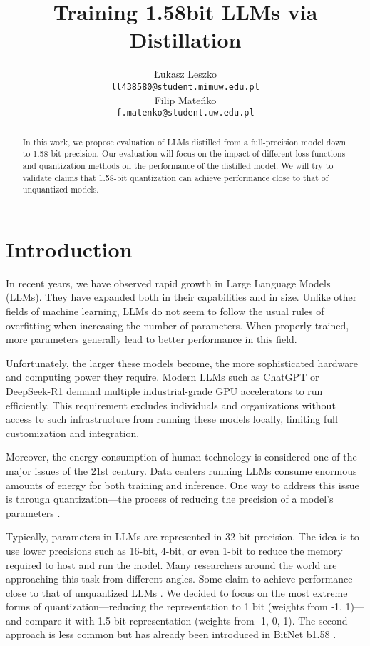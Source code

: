 \documentclass{article}
\title{Training 1.58bit LLMs via Distillation}
\author{Łukasz Leszko \\
	\texttt{ll438580@student.mimuw.edu.pl} \\
	\And
	Filip Mateńko \\
	\texttt{f.matenko@student.uw.edu.pl} \\
}
\begin{document}
\maketitle

\begin{abstract}
	In this work, we propose evaluation of LLMs distilled from a full-precision model down to 1.58-bit precision. Our evaluation will focus on the impact of different loss functions and quantization methods on the performance of the distilled model. We will try to validate claims that 1.58-bit quantization can achieve performance close to that of unquantized models.
\end{abstract}




\section{Introduction}
In recent years, we have observed rapid growth in Large Language Models (LLMs). They have expanded both in their capabilities and in size. 
Unlike other fields of machine learning, LLMs do not seem to follow the usual rules of overfitting when increasing the number of 
parameters. When properly trained, more parameters generally lead to better performance in this field. 

Unfortunately, the larger these models become, the more sophisticated hardware and computing power they require. Modern LLMs such as 
ChatGPT or DeepSeek-R1 demand multiple industrial-grade GPU accelerators to run efficiently. This requirement excludes individuals and 
organizations without access to such infrastructure from running these models locally, limiting full customization and integration.

Moreover, the energy consumption of human technology is considered one of the major issues of the 21st century. Data centers running LLMs 
consume enormous amounts of energy for both training and inference. One way to address this issue is through quantization—the process of 
reducing the precision of a model’s parameters \cite{quantizationtechniques}.

Typically, parameters in LLMs are represented in 32-bit precision. The idea is to use lower precisions such as 16-bit, 4-bit, 
or even 1-bit to reduce the memory required to host and run the model. Many researchers around the world are approaching this task from 
different angles. Some claim to achieve performance close to that of unquantized LLMs \cite{wang2023bitnetscaling1bittransformers}. We 
decided to focus on the most extreme forms of quantization—reducing the representation to 1 bit (weights from {-1, 1})—and compare it
with 1.5-bit representation (weights from {-1, 0, 1}). The second approach is less common but has already been introduced in BitNet 
b1.58 \cite{ma2024era1bitllmslarge}.
\end{document}
